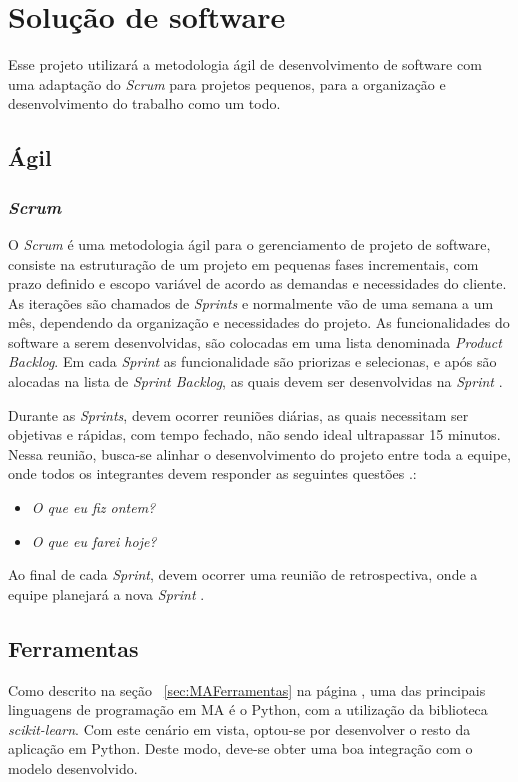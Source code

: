 \chapter[Solução de software]{Solução de software}
Esse projeto utilizará a metodologia ágil de desenvolvimento de software com uma adaptação do \textit{Scrum} para projetos pequenos, para a organização e desenvolvimento do trabalho como um todo.

\section{Ágil}
\subsection{\textit{Scrum}}
O \textit{Scrum} é uma metodologia ágil para o gerenciamento de projeto de software, consiste na estruturação de um projeto em pequenas fases incrementais, com prazo definido e escopo variável de acordo as demandas e necessidades do cliente. As iterações são chamados de \textit{Sprints} e normalmente vão de uma semana a um mês, dependendo da organização e necessidades do projeto. As funcionalidades do software a serem desenvolvidas, são colocadas em uma lista denominada \textit{Product Backlog}. Em cada \textit{Sprint} as funcionalidade são priorizas e selecionas, e após são alocadas na lista de \textit{Sprint Backlog}, as quais devem ser desenvolvidas na \textit{Sprint} \cite{sutherland2016scrum}.

Durante as \textit{Sprints}, devem ocorrer reuniões diárias, as quais necessitam ser objetivas e rápidas, com tempo fechado, não sendo ideal ultrapassar 15 minutos. Nessa reunião, busca-se alinhar o desenvolvimento do projeto entre toda a equipe, onde todos os integrantes devem responder as seguintes questões \cite{sutherland2016scrum}.:
\begin{itemize}
    \item \textit{O que eu fiz ontem?}
    \item \textit{O que eu farei hoje?}
\end{itemize}

Ao final de cada \textit{Sprint}, devem ocorrer uma reunião de retrospectiva, onde a equipe planejará a nova \textit{Sprint} \cite{sutherland2016scrum}.

\section{Ferramentas}
Como descrito na seção ~\ref{sec:MAFerramentas} na página \pageref{sec:MAFerramentas}, uma das principais linguagens de programação em MA é o Python, com a utilização da biblioteca \textit{scikit-learn}. Com este cenário em vista, optou-se por desenvolver o resto da aplicação em Python. Deste modo, deve-se obter uma boa integração com o modelo desenvolvido.

